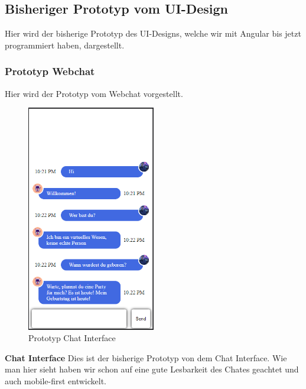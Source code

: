 \newpage

\subsection{Bisheriger Prototyp vom UI-Design}
Hier wird der bisherige Prototyp des UI-Designs, 
welche wir mit Angular bis jetzt programmiert haben, dargestellt.

\subsubsection{Prototyp Webchat}
Hier wird der Prototyp vom Webchat vorgestellt.

\begin{figure}[H]
    \centering
    \includegraphics[width=0.5\textwidth]{bilder/prototyp UI Design/Chatinterface mobil.png}
    \caption{Prototyp Chat Interface}
    \label{fig:Prototyp Chat Interface}
\end{figure}
\noindent \textbf{Chat Interface} \newline
Dies ist der bisherige Prototyp von dem Chat Interface. Wie man hier sieht haben wir schon auf eine 
gute Lesbarkeit des Chates geachtet und auch mobile-first entwickelt.

